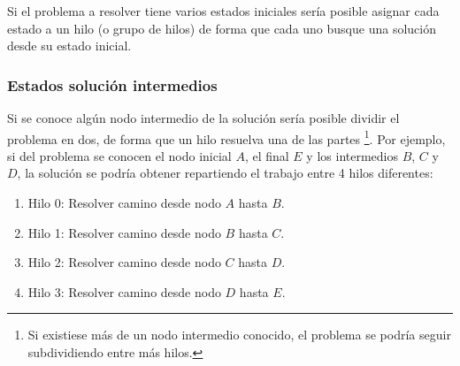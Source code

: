 Si el problema a resolver tiene varios estados iniciales
sería posible asignar cada estado a un hilo (o grupo de hilos)
de forma que cada uno busque una solución desde su estado inicial.

\subsubsection{Estados solución intermedios}

Si se conoce algún nodo intermedio de la solución
sería posible dividir el problema en dos,
de forma que un hilo resuelva una de las partes
\footnote{Si existiese más de un nodo intermedio conocido,
el problema se podría seguir subdividiendo entre más hilos.}.
Por ejemplo, si del problema se conocen el nodo inicial $A$,
el final $E$ y los intermedios $B$, $C$ y $D$,
la solución se podría obtener repartiendo el
trabajo entre 4 hilos diferentes:
\begin{enumerate}[start=0, itemsep=0.25px]
    \item Hilo 0: Resolver camino desde nodo $A$ hasta $B$.
    \item Hilo 1: Resolver camino desde nodo $B$ hasta $C$.
    \item Hilo 2: Resolver camino desde nodo $C$ hasta $D$.
    \item Hilo 3: Resolver camino desde nodo $D$ hasta $E$.
\end{enumerate}
